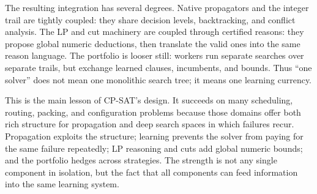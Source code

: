 The resulting integration has several degrees. Native propagators and the
integer trail are tightly coupled: they share decision levels, backtracking, and
conflict analysis. The LP and cut machinery are coupled through certified
reasons: they propose global numeric deductions, then translate the valid ones
into the same reason language. The portfolio is looser still: workers run
separate searches over separate trails, but exchange learned clauses, incumbents,
and bounds. Thus ``one solver'' does not mean one monolithic search tree; it
means one learning currency.

This is the main lesson of CP-SAT's design. It succeeds on many scheduling,
routing, packing, and configuration problems because those domains offer both
rich structure for propagation and deep search spaces in which failures recur.
Propagation exploits the structure; learning prevents the solver from paying for
the same failure repeatedly; LP reasoning and cuts add global numeric bounds; and
the portfolio hedges across strategies. The strength is not any single component
in isolation, but the fact that all components can feed information into the
same learning system.
